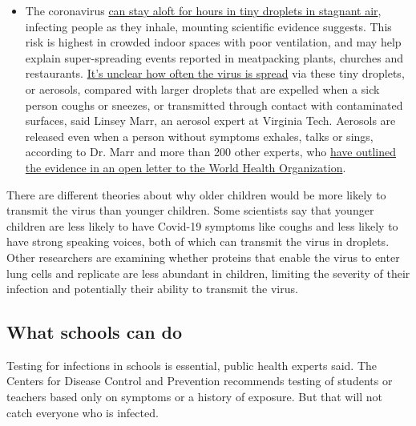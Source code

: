 \begin{itemize}
  \begin{itemize}
  \tightlist
  \item
    The coronavirus
    \href{https://www.nytimes.com/2020/07/04/health/239-experts-with-one-big-claim-the-coronavirus-is-airborne.html?action=click\&pgtype=Article\&state=default\&region=MAIN_CONTENT_3\&context=storylines_faq}{can
    stay aloft for hours in tiny droplets in stagnant air}, infecting
    people as they inhale, mounting scientific evidence suggests. This
    risk is highest in crowded indoor spaces with poor ventilation, and
    may help explain super-spreading events reported in meatpacking
    plants, churches and restaurants.
    \href{https://www.nytimes.com/2020/07/06/health/coronavirus-airborne-aerosols.html?action=click\&pgtype=Article\&state=default\&region=MAIN_CONTENT_3\&context=storylines_faq}{It's
    unclear how often the virus is spread} via these tiny droplets, or
    aerosols, compared with larger droplets that are expelled when a
    sick person coughs or sneezes, or transmitted through contact with
    contaminated surfaces, said Linsey Marr, an aerosol expert at
    Virginia Tech. Aerosols are released even when a person without
    symptoms exhales, talks or sings, according to Dr. Marr and more
    than 200 other experts, who
    \href{https://academic.oup.com/cid/article/doi/10.1093/cid/ciaa939/5867798}{have
    outlined the evidence in an open letter to the World Health
    Organization}.
  \end{itemize}
\end{itemize}

There are different theories about why older children would be more
likely to transmit the virus than younger children. Some scientists say
that younger children are less likely to have Covid-19 symptoms like
coughs and less likely to have strong speaking voices, both of which can
transmit the virus in droplets. Other researchers are examining whether
proteins that enable the virus to enter lung cells and replicate are
less abundant in children, limiting the severity of their infection and
potentially their ability to transmit the virus.

\hypertarget{what-schools-can-do}{%
\subsection{What schools can do}\label{what-schools-can-do}}

Testing for infections in schools is essential, public health experts
said. The Centers for Disease Control and Prevention recommends testing
of students or teachers based only on symptoms or a history of exposure.
But that will not catch everyone who is infected.

